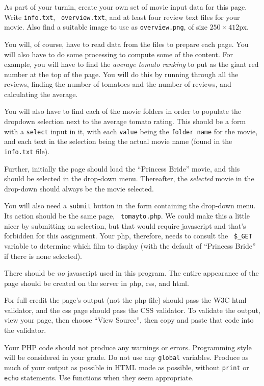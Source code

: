 \documentclass{article}
\newcommand{\myitem}[1]{\noindent\hspace{-.25in}{\bf #1}}
\begin{document}
\myitem{Your Own Movie:}  As part of your turnin, create your own set
of movie input data for this page.  Write {\tt info.txt}, {\tt
  overview.txt}, and at least four review text files for your movie.
Also find a suitable image to use as {\tt overview.png}, of size
$250\times412$px. 



\myitem{Server side computations:}   You will, of course, have to read
data from the files to prepare each page.  You will also have to do
some processing to compute some of the content.  For example, you will
have to find the {\em average tomato ranking} to put as the giant red
number at the top of the page.  You will do this by running through
all the reviews, finding the number of tomatoes and the number of
reviews, and calculating the average.

\myitem{Select movie dropdown:} You will also have to find each of the
movie folders in order to populate the dropdown selection next to the
average tomato rating.  This should be a form with a {\tt select}
input in it, with each {\tt value} being the {\tt folder name} for the
movie, and each text in the selection being the actual movie name
(found in the {\tt info.txt} file).

Further, initially the page should load the ``Princess Bride'' movie,
and this should be selected in the drop-down menu.  Thereafter, the
{\em selected} movie in the drop-down should always be the movie
selected.

You will also need a {\tt submit} button in the form containing the
drop-down menu.  Its action should be the same page, {\tt
  tomayto.php}.  We could make this a little nicer by submitting on
selection, but that would require javascript and that's forbidden for
this assignment.  Your php, therefore, needs to consult the {\tt
  \$\_GET} variable to determine which film to display (with the
default of ``Princess Bride'' if there is none selected).

  
\myitem{No javascript:} There should be {\em no} javascript used in
this program.  The entire appearance of the page should be created on
the server in php, css, and html.

\myitem{Validation:}  For full credit the page's output (not the php
file) should pass the W3C html validator, and the css page should pass
the CSS validator.  To validate the output, view your page, then
choose ``View Source'', then copy and paste that code into the
validator. 

\myitem{Style:} Your PHP code should not produce any warnings or
errors.  Programming style will be considered in your grade.  Do not
use any {\tt global} variables.  Produce as much of your output as
possible in HTML mode as possible, without {\tt print} or {\tt echo}
statements.  Use functions when they seem appropriate.
\end{document}
